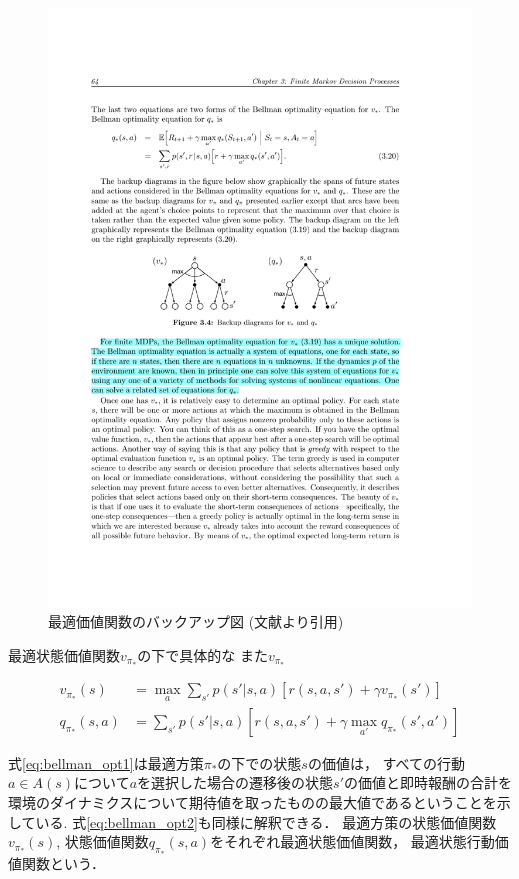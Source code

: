 \begin{figure}[h]
  \centering
  \includegraphics[width=\linewidth{}]{figures/backup.pdf}
  \caption{最適価値関数のバックアップ図 (文献\cite{Sutton1998}より引用) \label{fig:backup}}
\end{figure}

最適状態価値関数$v_{\pi_*}$の下で具体的な
また$v_{\pi_*}$

\begin{align}
  \label{eq:bellman_opt1}
  v_{\pi_*}(s) &= \max_a \sum_{s'}p(s'|s,a)[r(s,a,s') + \gamma v_{\pi_*}(s')] \\
  \label{eq:bellman_opt2}
  q_{\pi_*}(s,a) &= \sum_{s'}p(s'|s,a)[r(s,a,s') +\gamma \max_{a'}q_{\pi_*}(s',a')]
\end{align}

式\ref{eq:bellman_opt1}は最適方策$\pi_*$の下での状態$s$の価値は， すべての行動$a \in A(s)$について$a$を選択した場合の遷移後の状態$s'$の価値と即時報酬の合計を環境のダイナミクスについて期待値を取ったものの最大値であるということを示している.
式\ref{eq:bellman_opt2}も同様に解釈できる．
最適方策の状態価値関数$v_{\pi_*}(s)$, 状態価値関数$q_{\pi_*}(s,a)$をそれぞれ最適状態価値関数， 最適状態行動価値関数という．

